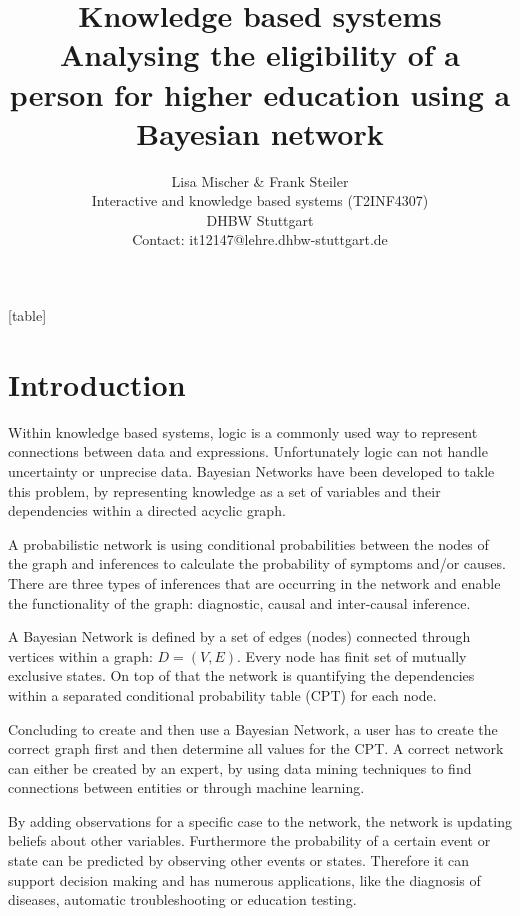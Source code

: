 \documentclass[%
	pdftex,
	oneside,        %
	11pt,           %
	parskip=half,   %
	headsepline,    %
	footsepline,    %
	abstracton,     %
	USenglish,      %
	a4paper,        %
]{report}
\title{Knowledge based systems\\ Analysing the eligibility of a person for higher education using a Bayesian network}
\author{Lisa Mischer \& Frank Steiler\\ Interactive and knowledge based systems (T2INF4307)\\ DHBW Stuttgart\\ Contact: it12147@lehre.dhbw-stuttgart.de}
\begin{document}

[table]

\maketitle

\newpage
\thispagestyle{empty}
\mbox{}
\setcounter{page}{0}

\tableofcontents

\chapter{Introduction}
Within knowledge based systems, logic is a commonly used way to represent connections between data and expressions. Unfortunately logic can not handle uncertainty or unprecise data. Bayesian Networks have been developed to takle this problem, by representing knowledge as a set of variables and their dependencies within a directed acyclic graph. \cite{Reichardt:2014aa}

A probabilistic network is using conditional probabilities between the nodes of the graph and inferences to calculate the probability of symptoms and/or causes. There are three types of inferences that are occurring in the network and enable the functionality of the graph: diagnostic, causal and inter-causal inference.

A Bayesian Network is defined by a set of edges (nodes) connected through vertices within a graph: $D=(V,E)$. Every node has finit set of mutually exclusive states. On top of that the network is quantifying the dependencies within a separated conditional probability table (CPT) for each node. \cite{Vomlel:2005aa}

Concluding to create and then use a Bayesian Network, a user has to create the correct graph first and then determine all values for the CPT. A correct network can either be created by an expert, by using data mining techniques to find connections between entities or through machine learning. 

By adding observations for a specific case to the network, the network is updating beliefs about other variables. Furthermore the probability of a certain event or state can be predicted by observing other events or states. Therefore it can support decision making and has numerous applications, like the diagnosis of diseases, automatic troubleshooting or education testing. \cite{Vomlel:2005aa}
\end{document}
